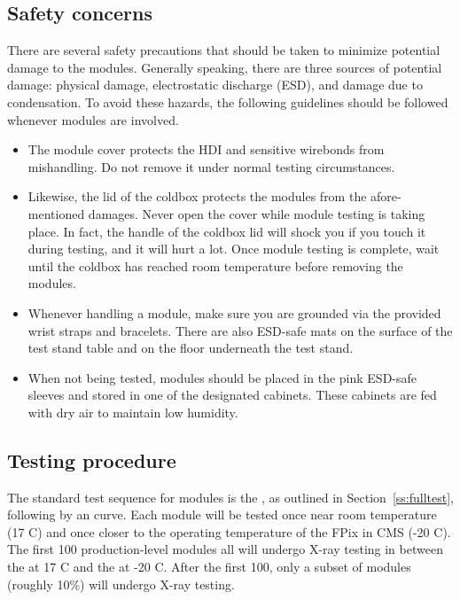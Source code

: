 \subsection{Safety concerns}
\label{ss:safety}

There are several safety precautions that should be taken to minimize potential damage to the modules.
Generally speaking, there are three sources of potential damage: 
physical damage, electrostatic discharge (ESD), and damage due to condensation.
To avoid these hazards, the following guidelines should be followed whenever modules are involved.
\begin{itemize}
\item The module cover protects the HDI and sensitive wirebonds from mishandling.
Do not remove it under normal testing circumstances.
\item Likewise, the lid of the coldbox protects the modules from the afore-mentioned damages.  
Never open the cover while module testing is taking place.  
In fact, the handle of the coldbox lid will shock you if you touch it during testing, and it will hurt a lot.
Once module testing is complete, wait until the coldbox has reached room temperature before removing the modules.
\item Whenever handling a module, make sure you are grounded via the provided wrist straps and bracelets.
There are also ESD-safe mats on the surface of the test stand table and on the floor underneath the test stand.
\item When not being tested, modules should be placed in the pink ESD-safe sleeves and stored in one of the designated cabinets.
These cabinets are fed with dry air to maintain low humidity.
\end{itemize}

\subsection{Testing procedure}
\label{ss:procedure}

The standard test sequence for modules is the \fulltest, as outlined in Section~\ref{ss:fulltest}, following by an \iv curve.
Each module will be tested once near room temperature (17 C) 
and once closer to the operating temperature of the FPix in CMS (-20 C).
The first 100 production-level modules all will undergo X-ray testing in between the \fulltest at 17 C and the \fulltest at -20 C.
After the first 100, only a subset of modules (roughly 10\%) will undergo X-ray testing.

